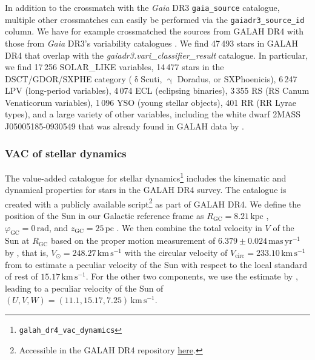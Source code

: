 \documentclass[
  journal=pasa,
  manuscript=research-paper, %
  year=2024,
  volume=37
]{cup-journal}
\newcommand{\Gaia}{\textit{Gaia}\xspace}
\begin{document}
In addition to the crossmatch with the \Gaia DR3 \texttt{gaia\_source} catalogue, multiple other crossmatches can easily be performed via the \texttt{gaiadr3\_source\_id} column. We have for example crossmatched the sources from GALAH DR4 with those from \Gaia DR3's variability catalogues \citep{Rimoldini2023}. We find 47\,493 stars in GALAH DR4 that overlap with the \textit{gaiadr3.vari\_classifier\_result} catalogue. In particular, we find 17\,256 SOLAR\_LIKE variables, 14\,477 stars in the DSCT/GDOR/SXPHE category ({$\updelta$}Scuti, {$\upgamma$} Doradus, or SXPhoenicis), 6\,247 LPV (long-period variables), 4\,074 ECL (eclipsing binaries), 3\,355 RS (RS Canum Venaticorum variables), 1\,096 YSO (young stellar objects), 401 RR (RR Lyrae types), and a large variety of other variables, including the white dwarf 2MASS J05005185-0930549 that was already found in GALAH data by \citet{Kawka2020}.

\subsubsection{VAC of stellar dynamics}
\label{sec:vac_dynamics}

The value-added catalogue for stellar dynamics\footnote{\texttt{galah\_dr4\_vac\_dynamics}} includes the kinematic and dynamical properties for stars in the GALAH DR4 survey. The catalogue is created with a publicly available script\footnote{Accessible in the GALAH DR4 repository \href{https://github.com/svenbuder/GALAH_DR4/blob/main/catalogs/create_galah_dr4_vac_dynamics.ipynb}{here}.} as part of GALAH DR4. 
We define the position of the Sun in our Galactic reference frame as $R_\mathrm{GC} = 8.21\,\mathrm{kpc}$ \citep{McMillan2017}, $\varphi_\mathrm{GC} = 0\,\mathrm{rad}$, and $z_\mathrm{GC} = 25\,\mathrm{pc}$ \citep{BlandHawthorn_Gerhard2016}. We then combine the total velocity in $V$ of the Sun at $R_\mathrm{GC}$ based on the proper motion measurement of $6.379\pm0.024\,\mathrm{mas\,yr^{-1}}$ by \citep{Reid2004}, that is, $V_\odot = 248.27\,\mathrm{km\,s^{-1}}$ with the circular velocity of $V_\mathrm{circ} = 233.10\,\mathrm{km\,s^{-1}}$ from \citet{McMillan2017} to estimate a peculiar velocity of the Sun with respect to the local standard of rest of  $15.17\,\mathrm{km\,s^{-1}}$. For the other two components, we use the estimate by \citet{Schoenrich2010}, leading to a peculiar velocity of the Sun of $(U,V,W) = (11.1, 15.17, 7.25)\,\mathrm{km\,s^{-1}}$.
\end{document}
